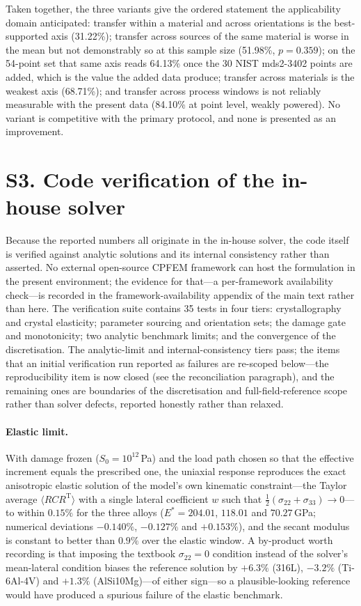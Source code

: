\documentclass[11pt,a4paper,twocolumn]{article}
\begin{document}
Taken together, the three variants give the ordered statement the applicability domain anticipated:
transfer within a material and across orientations is the best-supported axis (31.22\%); transfer across
sources of the same material is worse in the mean but not demonstrably so at this sample size (51.98\%,
$p = 0.359$); on the 54-point set that same axis reads 64.13\% once the 30 NIST mds2-3402 points are added, which is the value the added data produce; transfer across materials is the weakest axis (68.71\%); and transfer across process windows
is not reliably measurable with the present data (84.10\% at point level, weakly powered). No variant is
competitive with the primary protocol, and none is presented as an improvement.

\section*{S3. Code verification of the in-house solver}

Because the reported numbers all originate in the in-house solver, the code itself is verified against
analytic solutions and its internal consistency rather than asserted. No external open-source CPFEM
framework can host the formulation in the present environment; the evidence for that---a per-framework
availability check---is recorded in the framework-availability appendix of the main text rather than here.
The verification suite contains 35 tests in four tiers: crystallography and crystal elasticity; parameter
sourcing and orientation sets; the damage gate and monotonicity; two analytic benchmark limits; and the
convergence of the discretisation. The analytic-limit and internal-consistency tiers pass; the items that an
initial verification run reported as failures are re-scoped below---the reproducibility item is now closed (see the
reconciliation paragraph), and the remaining ones are boundaries of the discretisation and full-field-reference
scope rather than solver defects, reported honestly rather than relaxed.

\paragraph{Elastic limit.} With damage frozen ($S_0 = 10^{12}$\,Pa) and the load path chosen so that the
effective increment equals the prescribed one, the uniaxial response reproduces the exact anisotropic
elastic solution of the model's own kinematic constraint---the Taylor average $\langle RCR^{\mathrm T}\rangle$
with a single lateral coefficient $w$ such that $\tfrac12(\sigma_{22}+\sigma_{33}) \to 0$---to within
$0.15\%$ for the three alloys ($E^{*} = 204.01$, $118.01$ and $70.27$\,GPa; numerical deviations
$-0.140\%$, $-0.127\%$ and $+0.153\%$), and the secant modulus is constant to better than $0.9\%$ over
the elastic window. A by-product worth recording is that imposing the textbook $\sigma_{22} = 0$
condition instead of the solver's mean-lateral condition biases the reference solution by $+6.3\%$
(316L), $-3.2\%$ (Ti-6Al-4V) and $+1.3\%$ (AlSi10Mg)---of either sign---so a plausible-looking reference
would have produced a spurious failure of the elastic benchmark.
\end{document}
